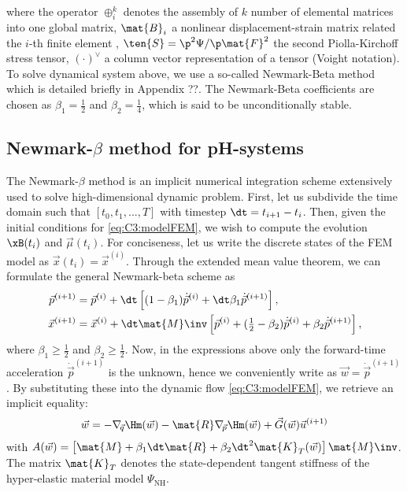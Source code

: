 %
where the operator $\oplus_i^{k}$ denotes the assembly of $k$ number of elemental matrices into one global matrix, $\mat{B}_i$ a nonlinear displacement-strain matrix related the $i$-th finite element \cite{Kim2018}, $\ten{S} = \p^2 \Psi/\p \mat{F}^2
$ the second Piolla-Kirchoff stress tensor, $(\cdot)^\vee$ a column vector representation of a tensor (Voight notation). To solve dynamical system above, we use a so-called Newmark-Beta method which is detailed briefly in Appendix ??. The Newmark-Beta coefficients are chosen as $\beta_1 = \frac{1}{2}$ and $\beta_2 = \frac{1}{4}$, which is said to be unconditionally stable.
%
\subsection{Newmark-$\beta$ method for pH-systems}
The Newmark-$\beta$ method is an implicit numerical integration scheme extensively used to solve high-dimensional dynamic problem. First, let us subdivide the time domain such that $[t_0,t_1,...,T]$ with timestep $\dt = t_{i+1} - t_i$. Then, given the initial conditions for \eqref{eq:C3:modelFEM}, we wish to compute the evolution $\xB(t_i)$ and $\vec{\mu}(t_i)$. For conciseness, let us write the discrete states of the FEM model as $\vec{x}(t_i) = \vec{x}^{(i)}$. Through the extended mean value theorem, we can formulate the general Newmark-beta scheme as
%
\begin{align}
{\vec{p}}^{(i+1)} & = {\vec{p}}^{(i)} + \dt \left[(1-\beta_1)\dot{\vec{p}}^{(i)} + \dt \beta_1 \dot{\vec{p}}^{(i+1)} \right], \\
%
{\vec{x}}^{(i+1)} & = {\vec{x}}^{(i)}  +  \dt \mat{M}\inv \left[ \vec{p}^{(i)} + (\tfrac{1}{2}-\beta_2)\dot{\vec{p}}^{(i)} + \beta_2 \dot{\vec{p}}^{(i+1)} \right],
\end{align}
%
where $\beta_1 \ge \frac{1}{2}$ and $\beta_2 \ge \frac{1}{2}$. Now, in the expressions above only the forward-time acceleration $\dot{\vec{p}}^{(i+1)}$ is the unknown, hence we conveniently write as $\vec{w} = \dot{\vec{p}}^{(i+1)}$. By substituting these into the dynamic flow \eqref{eq:C3:modelFEM}, we retrieve an implicit equality:
%
\begin{multline}
\vec{w} = -\nabla_{\!\vec{q}}\Hm(\vec{w}) -\mat{R}\nabla_{\!\vec{p}}\Hm(\vec{w}) + \vec{G}(\vec{w})\vec{u}^{(i+1)}
\end{multline}
%
with $A(\vec{w}) = \left[\mat{M} + \beta_1 \dt \mat{R} + \beta_2 \dt^2 \mat{K}_{T}(\vec{w}) \right]\mat{M}\inv$. The matrix $\mat{K}_T$ denotes the state-dependent tangent stiffness of the hyper-elastic material model $\Psi_{\text{NH}}$.

